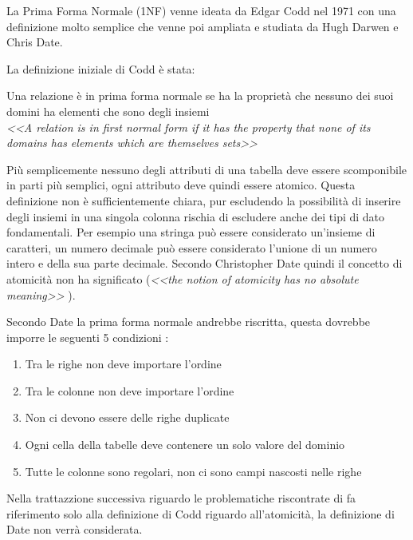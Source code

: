 La Prima Forma Normale (1NF) venne ideata da Edgar Codd nel 1971 con una definizione molto semplice che venne poi ampliata e studiata da Hugh Darwen e Chris Date.

La definizione iniziale di Codd è stata:

\begin{framed}
	Una relazione è in prima forma normale se ha la proprietà che nessuno dei suoi domini ha elementi che sono degli insiemi \\	
	
	\emph{<<A relation is in first normal form if it has the property that none of its domains has elements which are themselves sets>>} \cite{codd:relationalmodel}
\end{framed}

Più semplicemente nessuno degli attributi di una tabella deve essere scomponibile in parti più semplici, ogni attributo deve quindi essere atomico. Questa definizione non è sufficientemente chiara, pur escludendo la possibilità di inserire degli insiemi in una singola colonna rischia di escludere anche dei tipi di dato fondamentali. Per esempio una stringa può essere considerato un'insieme di caratteri, un numero decimale può essere considerato l'unione di un numero intero e della sua parte decimale. Secondo Christopher Date quindi il concetto di atomicità non ha significato (\emph{<<the notion of atomicity has no absolute meaning>>} \cite[p.~112]{date:dateondatabase}).

Secondo Date la prima forma normale andrebbe riscritta, questa dovrebbe imporre le seguenti 5 condizioni \cite[p.~127-128]{date:dateondatabase}:

\begin{framed}
	\begin{enumerate}
		\item Tra le righe non deve importare l'ordine
		\item Tra le colonne non deve importare l'ordine
		\item Non ci devono essere delle righe duplicate
		\item Ogni cella della tabelle deve contenere un solo valore del dominio
		\item Tutte le colonne sono regolari, non ci sono campi nascosti nelle righe
	\end{enumerate}
\end{framed}

Nella trattazzione successiva riguardo le problematiche riscontrate di fa riferimento solo alla definizione di Codd riguardo all'atomicità, la definizione di Date non verrà considerata.

